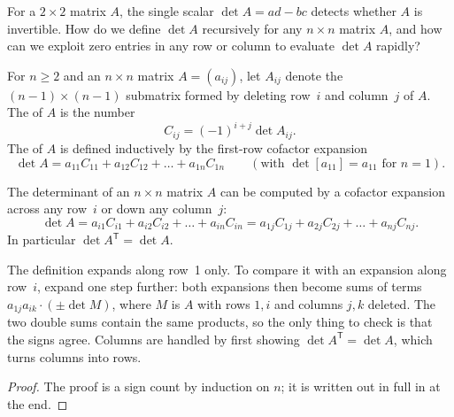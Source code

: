 \documentclass[10pt]{scrartcl}
\begin{document}
\begin{qbox}
  For a $2\times 2$ matrix $A$, the single scalar $\det A=ad-bc$ detects whether $A$ is invertible. How do we define $\det A$ recursively for any $n\times n$ matrix $A$, and how can we exploit zero entries in any row or column to evaluate $\det A$ rapidly?
\end{qbox}

\begin{definition*}
  For $n\ge 2$ and an $n\times n$ matrix $A=(a_{ij})$, let $A_{ij}$ denote the $(n-1)\times(n-1)$ submatrix formed by deleting row~$i$ and column~$j$ of $A$. The  of $A$ is the number
  \[
    C_{ij} = (-1)^{i+j}\det A_{ij}.
  \]
  The  of $A$ is defined inductively by the first-row cofactor expansion
  \[
    \det A = a_{11}C_{11} + a_{12}C_{12} + \dots + a_{1n}C_{1n} \qquad (\text{with }\det[a_{11}]=a_{11}\text{ for }n=1).
  \]
\end{definition*}

\begin{theorem*}
  The determinant of an $n\times n$ matrix $A$ can be computed by a cofactor expansion across any row~$i$ or down any column~$j$:
  \[
    \det A = a_{i1}C_{i1} + a_{i2}C_{i2} + \dots + a_{in}C_{in} = a_{1j}C_{1j} + a_{2j}C_{2j} + \dots + a_{nj}C_{nj}.
  \]
  In particular $\det A^{\mathsf T}=\det A$.
\end{theorem*}
\begin{ideabox}
  The definition expands along row~1 only. To compare it with an expansion along row~$i$, expand one step further: both expansions then become sums of terms $a_{1j}a_{ik}\cdot(\pm\det M)$, where $M$ is $A$ with rows $1,i$ and columns $j,k$ deleted. The two double sums contain the same products, so the only thing to check is that the signs agree. Columns are handled by first showing $\det A^{\mathsf T}=\det A$, which turns columns into rows.
\end{ideabox}
\begin{proof}
  The proof is a sign count by induction on $n$; it is written out in full in  at the end.
\end{proof}
\end{document}

